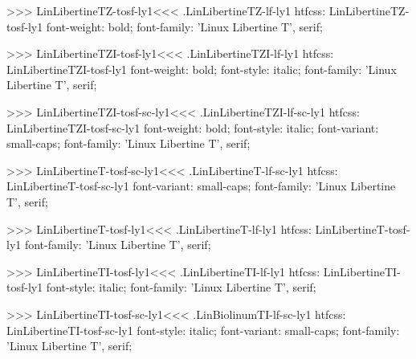 {{{>>>
\<LinLibertineTZ-tosf-ly1\><<<
.LinLibertineTZ-lf-ly1
htfcss:  LinLibertineTZ-tosf-ly1  font-weight: bold; font-family: 'Linux Libertine T', serif;

>>>
\<LinLibertineTZI-tosf-ly1\><<<
.LinLibertineTZI-lf-ly1
htfcss:  LinLibertineTZI-tosf-ly1  font-weight: bold; font-style: italic; font-family: 'Linux Libertine T', serif;

>>>
\<LinLibertineTZI-tosf-sc-ly1\><<<
.LinLibertineTZI-lf-sc-ly1
htfcss:  LinLibertineTZI-tosf-sc-ly1  font-weight: bold; font-style: italic; font-variant: small-caps; font-family: 'Linux Libertine T', serif;

>>>
\<LinLibertineT-tosf-sc-ly1\><<<
.LinLibertineT-lf-sc-ly1
htfcss:  LinLibertineT-tosf-sc-ly1  font-variant: small-caps; font-family: 'Linux Libertine T', serif;

>>>
\<LinLibertineT-tosf-ly1\><<<
.LinLibertineT-lf-ly1
htfcss:  LinLibertineT-tosf-ly1  font-family: 'Linux Libertine T', serif;

>>>
\<LinLibertineTI-tosf-ly1\><<<
.LinLibertineTI-lf-ly1
htfcss:  LinLibertineTI-tosf-ly1  font-style: italic; font-family: 'Linux Libertine T', serif;

>>>
\<LinLibertineTI-tosf-sc-ly1\><<<
.LinBiolinumTI-lf-sc-ly1
htfcss:  LinLibertineTI-tosf-sc-ly1  font-style: italic; font-variant: small-caps; font-family: 'Linux Libertine T', serif;

}}}
